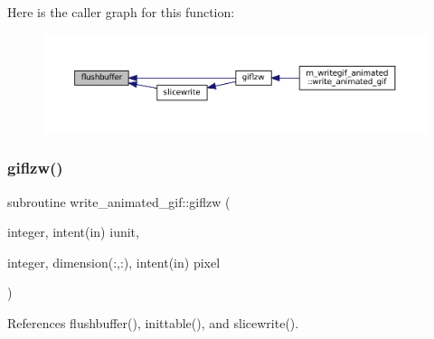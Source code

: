 Here is the caller graph for this function\+:
\nopagebreak
\begin{figure}[H]
\begin{center}
\leavevmode
\includegraphics[width=350pt]{M__writegif__animated_8f90_a83cb0569b0e010d8ad27afd1b4cd945e_icgraph}
\end{center}
\end{figure}
\mbox{\label{M__writegif__animated_8f90_aa30b256c6cb90f13a18e32768d35696b}} 
\subsubsection{\texorpdfstring{giflzw()}{giflzw()}}
{\footnotesize\ttfamily subroutine write\+\_\+animated\+\_\+gif\+::giflzw (\begin{DoxyParamCaption}\item[{integer, intent(in)}]{iunit,  }\item[{integer, dimension(\+:,\+:), intent(in)}]{pixel }\end{DoxyParamCaption})\hspace{0.3cm}{\ttfamily [private]}}



References flushbuffer(), inittable(), and slicewrite().

